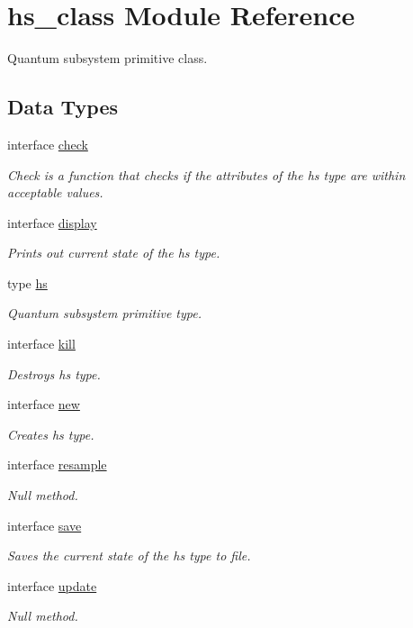 \hypertarget{namespacehs__class}{}\section{hs\+\_\+class Module Reference}
\label{namespacehs__class}


Quantum subsystem primitive class.  


\subsection*{Data Types}
\begin{DoxyCompactItemize}
\item 
interface \hyperlink{interfacehs__class_1_1check}{check}
\begin{DoxyCompactList}\small\item\em Check is a function that checks if the attributes of the hs type are within acceptable values. \end{DoxyCompactList}\item 
interface \hyperlink{interfacehs__class_1_1display}{display}
\begin{DoxyCompactList}\small\item\em Prints out current state of the hs type. \end{DoxyCompactList}\item 
type \hyperlink{strucths__class_1_1hs}{hs}
\begin{DoxyCompactList}\small\item\em Quantum subsystem primitive type. \end{DoxyCompactList}\item 
interface \hyperlink{interfacehs__class_1_1kill}{kill}
\begin{DoxyCompactList}\small\item\em Destroys hs type. \end{DoxyCompactList}\item 
interface \hyperlink{interfacehs__class_1_1new}{new}
\begin{DoxyCompactList}\small\item\em Creates hs type. \end{DoxyCompactList}\item 
interface \hyperlink{interfacehs__class_1_1resample}{resample}
\begin{DoxyCompactList}\small\item\em Null method. \end{DoxyCompactList}\item 
interface \hyperlink{interfacehs__class_1_1save}{save}
\begin{DoxyCompactList}\small\item\em Saves the current state of the hs type to file. \end{DoxyCompactList}\item 
interface \hyperlink{interfacehs__class_1_1update}{update}
\begin{DoxyCompactList}\small\item\em Null method. \end{DoxyCompactList}\end{DoxyCompactItemize}
